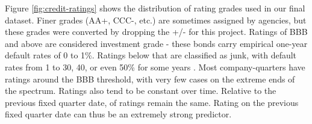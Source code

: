 \documentclass{article}[11pt]
\begin{document}
    Figure \ref{fig:credit-ratings} shows the distribution of rating grades used in our final dataset. Finer grades (AA+, CCC-, etc.) are sometimes assigned by agencies, but these grades were converted by dropping the +/- for this project. Ratings of BBB and above are considered investment grade - these bonds carry empirical one-year default rates of 0 to 1\%. Ratings below that are classified as junk, with default rates from 1 to 30, 40, or even 50\% for some years \citep{s_and_p_global_ratings_s_2024}. Most company-quarters have ratings around the BBB threshold, with very few cases on the extreme ends of the spectrum. Ratings also tend to be constant over time. Relative to the previous fixed quarter date, \shareNotChanges \space of ratings remain the same. Rating on the previous fixed quarter date can thus be an extremely strong predictor.
\end{document}
